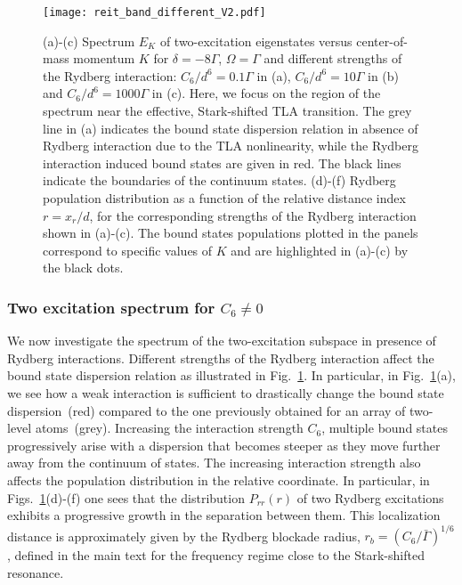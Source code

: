 \documentclass[pra,twocolumn,showpacs,preprintnumbers,amsmath,amssymb]{revtex4-1}
\begin{document}
 
 
 
 \begin{figure}
\texttt{[image: reit\_band\_different\_V2.pdf]}%
\caption{(a)-(c) Spectrum $E_K$ of two-excitation eigenstates versus center-of-mass momentum $K$ for $\delta=-8\Gamma$, $\Omega=\Gamma$ and different strengths of the Rydberg interaction: $C_6/d^6=0.1\Gamma$ in (a), $C_6/d^6=10\Gamma$ in (b) and $C_6/d^6=1000\Gamma$ in (c). Here, we focus on the region of the spectrum near the effective, Stark-shifted TLA transition. The grey line in (a) indicates the bound state dispersion relation in absence of Rydberg interaction due to the TLA nonlinearity, while the Rydberg interaction induced bound states are given in red. The black lines indicate the boundaries of the continuum states. (d)-(f) Rydberg population distribution as a function of the relative distance index $r=x_r/d$, for the corresponding strengths of the Rydberg interaction shown in (a)-(c). The bound states populations plotted in the panels correspond to specific values of $K$ and are highlighted in (a)-(c) by the black dots.}
\label{Fig.Rybderg_band_differentV}
\end{figure}




 

\subsubsection{Two excitation spectrum for $C_6\neq 0$}\label{App.RydEIT_loc}

We now investigate the spectrum of the two-excitation subspace in presence of Rydberg interactions. Different strengths of the Rydberg interaction affect the bound state dispersion relation as illustrated in Fig.~\ref{Fig.Rybderg_band_differentV}. In particular, in Fig.~\ref{Fig.Rybderg_band_differentV}(a), we see how a weak interaction is 
sufficient to drastically change the bound state dispersion~(red) compared to the one previously obtained for an array of two-level atoms~(grey). Increasing the interaction strength $C_6$, multiple bound states progressively arise with a dispersion that becomes steeper as they move further away from the continuum of states.
The increasing interaction strength also affects the population distribution in the relative coordinate. In particular, in Figs.~\ref{Fig.Rybderg_band_differentV}(d)-(f) one sees that the distribution $P_{rr}(r)$ of two Rydberg excitations exhibits a progressive growth in the separation between them. This localization distance is approximately given by the Rydberg blockade radius, $r_b=(C_6/\bar \Gamma)^{1/6}$, defined in the main text for the frequency regime close to the Stark-shifted resonance.
\end{document}

